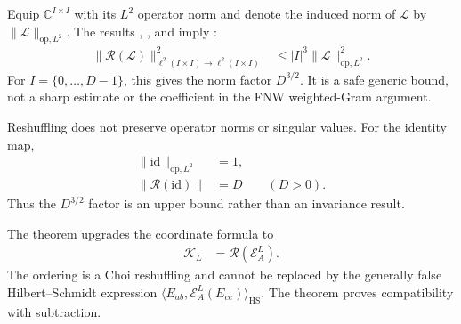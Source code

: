 \documentclass{article}
\providecommand{\Fin}[1]{\{0,\ldots,#1{-}1\}}
\begin{document}
Equip $\mathbb C^{I\times I}$ with its $L^2$ operator norm and denote the
induced norm of $\mathcal L$ by
$\lVert\mathcal L\rVert_{\mathrm{op},L^2}$. The results
,
, and
 imply
:
\begin{align}
    \lVert\mathscr R(\mathcal L)\rVert_{
        \ell^2(I\times I)\to\ell^2(I\times I)}^2
     & \leq
    |I|^3\lVert\mathcal L\rVert_{\mathrm{op},L^2}^2.
    \label{eq:cpgsv21_martingale_overlap_reshuffling_dimension_bound}
\end{align}
For $I=\Fin{D}$, this gives the norm factor $D^{3/2}$. It is a safe generic
bound, not a sharp estimate or the coefficient in the FNW weighted-Gram
argument.

Reshuffling does not preserve operator norms or singular values. For the
identity map,
\begin{align}
    \lVert\mathrm{id}\rVert_{\mathrm{op},L^2}
     & =1,
    \label{eq:cpgsv21_martingale_overlap_identity_map_norm} \\
    \lVert\mathscr R(\mathrm{id})\rVert
     & =D
    \qquad(D>0).
    \label{eq:cpgsv21_martingale_overlap_identity_reshuffling_norm}
\end{align}
Thus the $D^{3/2}$ factor is an upper bound rather than an invariance result.

The theorem
 upgrades the coordinate
formula to
\begin{align}
    \mathcal K_L
     & =\mathscr R(\mathcal E_A^L).
    \label{eq:cpgsv21_martingale_overlap_exact_gram_reshuffling}
\end{align}
The ordering is a Choi reshuffling and cannot be replaced by the generally
false Hilbert--Schmidt expression
$\langle E_{ab},\mathcal E_A^L(E_{ce})\rangle_{\mathrm{HS}}$. The theorem
 proves compatibility with subtraction.
\end{document}
